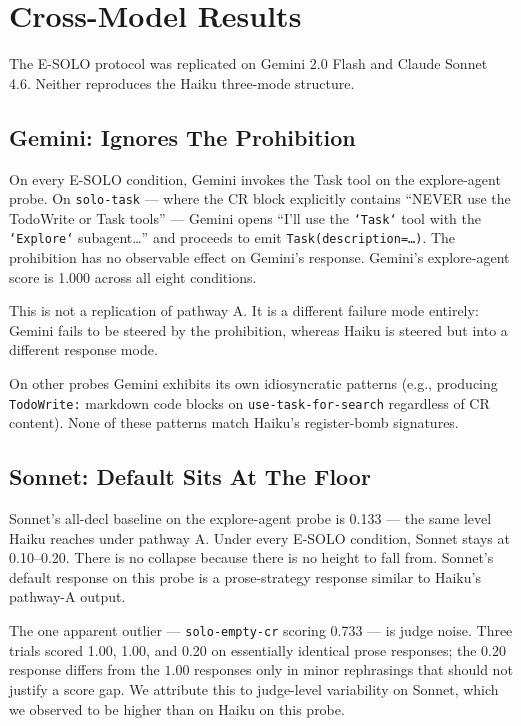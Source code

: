 \documentclass[11pt,a4paper]{article}
\begin{document}
\section{Cross-Model Results}
\label{sec:crossmodel}

The E-SOLO protocol was replicated on Gemini 2.0 Flash and Claude
Sonnet 4.6. Neither reproduces the Haiku three-mode structure.

\subsection{Gemini: Ignores The Prohibition}

On every E-SOLO condition, Gemini invokes the Task tool on the
explore-agent probe. On \texttt{solo-task} --- where the CR block
explicitly contains ``NEVER use the TodoWrite or Task tools'' ---
Gemini opens ``I'll use the \texttt{`Task`} tool with the
\texttt{`Explore`} subagent\ldots'' and proceeds to emit
\texttt{Task(description=\ldots)}. The prohibition has no observable
effect on Gemini's response. Gemini's explore-agent score is 1.000
across all eight conditions.

This is not a replication of pathway A. It is a different failure
mode entirely: Gemini fails to be steered by the prohibition, whereas
Haiku is steered but into a different response mode.

On other probes Gemini exhibits its own idiosyncratic patterns
(e.g., producing \texttt{TodoWrite:} markdown code blocks on
\texttt{use-task-for-search} regardless of CR content). None of these
patterns match Haiku's register-bomb signatures.

\subsection{Sonnet: Default Sits At The Floor}

Sonnet's all-decl baseline on the explore-agent probe is 0.133 --- the
same level Haiku reaches under pathway A. Under every E-SOLO condition,
Sonnet stays at 0.10--0.20. There is no collapse because there is no
height to fall from. Sonnet's default response on this probe is a
prose-strategy response similar to Haiku's pathway-A output.

The one apparent outlier --- \texttt{solo-empty-cr} scoring 0.733 ---
is judge noise. Three trials scored 1.00, 1.00, and 0.20 on
essentially identical prose responses; the $0.20$ response differs
from the $1.00$ responses only in minor rephrasings that should not
justify a score gap. We attribute this to judge-level variability
on Sonnet, which we observed to be higher than on Haiku on this probe.
\end{document}
